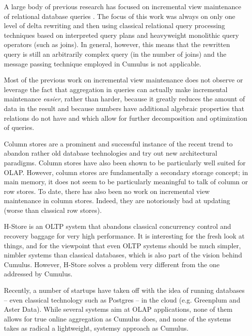 A large body of previous research has focused on incremental view maintenance
of relational database queries
\cite{roussopoulos-tods:91,griffin-sigmod:95,colby-sigmod:96,yan-vldb:95,kotidis-tods:01,zhou-vldb:07}.
The focus of this work was always on only one level of delta rewriting
and then using classical relational query processing techniques
based on interpreted query plans and heavyweight monolithic query operators
(such as joins).
In general, however, this means
that the rewritten query is still an arbitrarily complex query (in the number
of joins) and the message passing technique employed in Cumulus is not
applicable.

Most of the previous work on incremental view maintenance does not observe or leverage the fact that aggregation in queries can actually make incremental maintenance {\em easier}, rather than harder, because it greatly reduces the amount of data in the result and because numbers have additional algebraic properties that relations do not have and which allow for further decomposition and optimization of queries.

Column stores \cite{DBLP:journals/tods/Batory79,DBLP:conf/cidr/KerstenM05,DBLP:conf/vldb/StonebrakerMAHHH07}
are a prominent and successful instance of the recent trend
to abandon rather old database technologies and try out new architectural
para\-digms. Column stores have also been shown to be particularly well suited
for OLAP. However, column stores are fundamentally a secondary storage
concept; in main memory, it does not seem to be particularly meaningful to talk of column or row stores. To date, there has also been no work
on incremental view maintenance in column stores.
Indeed, they are notoriously bad at updating (worse than classical row stores).

H-Store is an OLTP system that abandons classical concurrency control and
recovery baggage for very high performance. It is interesting for the
fresh look at things, and for the viewpoint that even OLTP systems should
be much simpler, nimbler systems than classical databases, which is also
part of the vision behind Cumulus. However, H-Store solves a problem very
different from the one addressed by Cumulus.

Recently, a number of startups have taken off with the idea of running
databases -- even classical technology such as Postgres -- in the cloud
(e.g. Greenplum and Aster Data). While several systems aim at OLAP
applications, none of them allows for true online aggregation as Cumulus does,
and none of the systems takes as radical a lightweight, systemsy approach
as Cumulus.
